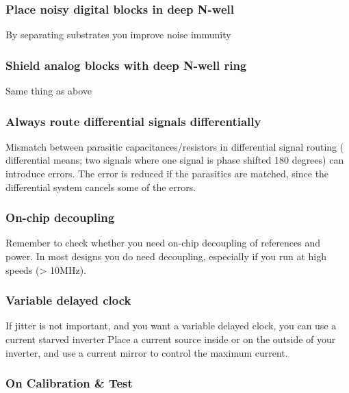 \subsubsection{Place noisy digital blocks in deep
N-well}\label{place-noisy-digital-blocks-in-deep-n-well}

By separating substrates you improve noise immunity

\subsubsection{Shield analog blocks with deep N-well
ring}\label{shield-analog-blocks-with-deep-n-well-ring}

Same thing as above

\subsubsection{Always route differential signals
differentially}\label{always-route-differential-signals-differentially}

Mismatch between parasitic capacitances/resistors in differential signal
routing ( differential means; two signals where one signal is phase
shifted 180 degrees) can introduce errors. The error is reduced if the
parasitics are matched, since the differential system cancels some of
the errors.

\subsubsection{On-chip decoupling}\label{on-chip-decoupling}

Remember to check whether you need on-chip decoupling of references and
power. In most designs you do need decoupling, especially if you run at
high speeds (\textgreater{} 10MHz).

\subsubsection{Variable delayed clock}\label{variable-delayed-clock}

If jitter is not important, and you want a variable delayed clock, you
can use a current starved inverter Place a current source inside or on
the outside of your inverter, and use a current mirror to control the
maximum current.

\subsubsection{On Calibration \& Test}\label{on-calibration-test}

